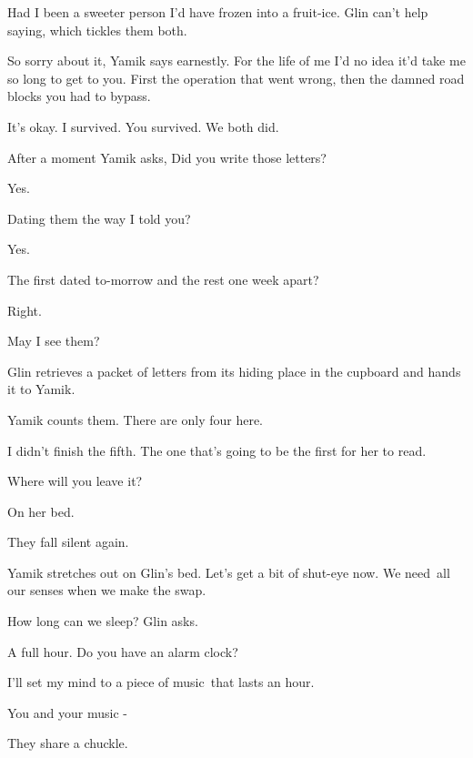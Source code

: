 \documentclass[letterpaper]{article}
\begin{document}
{\textquotedbl}Had I been a sweeter person I'd have frozen into a fruit-ice.{\textquotedbl} Glin can't help saying,
which tickles them both.

{\textquotedbl}So sorry about it,{\textquotedbl} Yamik says earnestly. {\textquotedbl}For the life of me I'd no idea
it'd take me so long to get to you. First the operation that went wrong, then the damned road blocks you had to
bypass.{\textquotedbl}

{\textquotedbl}It's okay. I survived. You survived. We both did.{\textquotedbl}

After a moment Yamik asks, {\textquotedbl}Did you write those letters?{\textquotedbl} 

{\textquotedbl}Yes.{\textquotedbl} 

{\textquotedbl}Dating them the way I told you?{\textquotedbl} 

{\textquotedbl}Yes.{\textquotedbl} 

{\textquotedbl}The first dated to-morrow and the rest one week apart?{\textquotedbl} 

{\textquotedbl}Right.{\textquotedbl} 

{\textquotedbl}May I see them?{\textquotedbl} 

Glin retrieves a packet of letters from its hiding place in the cupboard and hands it to Yamik. 

Yamik counts them. {\textquotedbl}There are only four here.{\textquotedbl} 

{\textquotedbl}I didn't finish the fifth. The one that's going to be the first for her to read.{\textquotedbl} 

{\textquotedbl}Where will you leave it?{\textquotedbl} 

{\textquotedbl}On her bed.{\textquotedbl}

They fall silent again.

Yamik stretches out on Glin's bed. {\textquotedbl}Let's get a bit of shut-eye now. We need~all our senses when we make
the swap.{\textquotedbl} 

{\textquotedbl}How long can we sleep?{\textquotedbl} Glin asks. 

{\textquotedbl}A full hour. Do you have an alarm clock?{\textquotedbl} 

{\textquotedbl}I'll set my mind to a piece of music~that lasts an hour.{\textquotedbl} 

{\textquotedbl}You and your music -{\textquotedbl}

They share a chuckle. 
\end{document}
